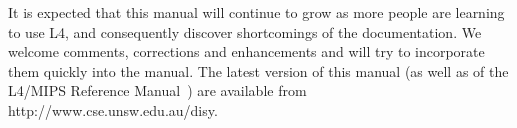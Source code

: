 \documentclass[a4paper,11pt,twoside,dvips]{report}
\newcommand{\Tilde}{\raisebox{-0.6ex}{\~{}}}
\begin{document}
It is expected that this manual will continue to grow as more people are
learning to use L4, and consequently discover shortcomings of the
documentation.  We welcome comments, corrections and enhancements and
will try to incorporate them quickly into the manual.  The latest
version of this manual (as well as of the L4/MIPS Reference
Manual~\cite{Elphinstone_HL:L4rm}) are available from
\textsf{http://www.cse.unsw.edu.au/{\Tilde}disy}.

\cleardoublepage
\setcounter{page}{7}
\tableofcontents

\cleardoublepage
\setcounter{page}{1}






%



\end{document}
